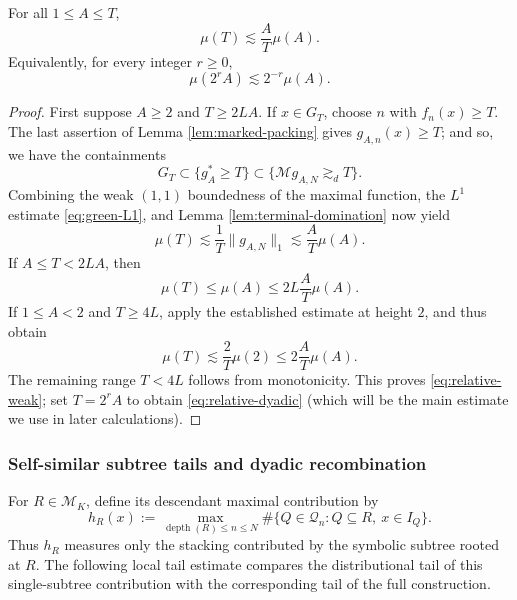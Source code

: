 \documentclass[12pt]{amsart}
\numberwithin{equation}{section}
\newcommand{\cM}{\mathcal{M}}
\begin{document}
\begin{proposition}\label{prop:relative-weak}
For all $1\leq A\leq T$,
\begin{equation}\label{eq:relative-weak}
 \mu(T)\lesssim\frac{A}{T}\mu(A).
\end{equation}
Equivalently, for every integer $r\geq0$,
\begin{equation}\label{eq:relative-dyadic}
 \mu(2^rA)\lesssim2^{-r}\mu(A).
\end{equation}
\end{proposition}

\begin{proof}
First suppose $A\geq2$ and $T\geq2LA$.  If $x\in G_T$, choose $n$ with $f_n(x)\geq T$.  The last assertion of Lemma \ref{lem:marked-packing} gives $g_{A,n}(x)\geq T$; and so, we have the containments
\[
 G_T\subset\{g_A^*\geq T\}
 \subset\{\cM g_{A,N}\gtrsim_d T\}.
\]
Combining the weak $(1,1)$ boundedness of the maximal function, the $L^1$ estimate \eqref{eq:green-L1}, and Lemma \ref{lem:terminal-domination} now yield
\[
 \mu(T)\lesssim\frac1T\|g_{A,N}\|_1
 \lesssim\frac{A}{T}\mu(A).
\]
If $A\leq T<2LA$, then
\[
 \mu(T)\leq\mu(A)\leq2L\frac AT\mu(A).
\]
If $1\leq A<2$ and $T\geq4L$, apply the established estimate at height $2$, and thus obtain
\[
 \mu(T)\lesssim\frac2T\mu(2)
 \leq2\frac AT\mu(A).
\]
The remaining range $T<4L$ follows from monotonicity.  This proves
\eqref{eq:relative-weak}; set $T=2^rA$ to obtain \eqref{eq:relative-dyadic} (which will be the main estimate we use in later calculations).
\end{proof}

\subsubsection{Self-similar subtree tails and dyadic recombination}\label{subsubsec:selfsimtails}

For $R\in\mathscr M_K$, define its descendant maximal contribution by
\begin{equation}\label{eq:local-contribution}
 h_R(x)
 :=
 \max_{\operatorname{depth}(R)\leq n\leq N}
 \#\bigl\{
 Q\in\mathscr Q_n:Q\subseteq R,\ x\in I_Q
 \bigr\}.
\end{equation}
Thus $h_R$ measures only the stacking contributed by the symbolic subtree
rooted at $R$.  The following local tail estimate compares the distributional
tail of this single-subtree contribution with the corresponding tail of the
full construction.
\end{document}
